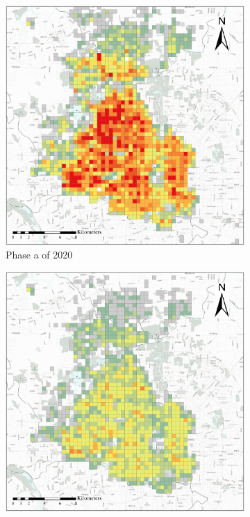 \documentclass[preprints,ijgi,submit,moreauthors]{Definitions/mdpi}
\begin{document}
\begin{figure}[ht]
    \centering
    \begin{subfigure}{.28\textwidth}
        \includegraphics[width=\textwidth]{Figures/BSSPhase1_2020.eps}
        \caption{Phase a of 2020}\label{fig:p_a_2020}
    \end{subfigure}
    \begin{subfigure}{.28\textwidth}
        \includegraphics[width=\textwidth]{Figures/BSSPhase2_2020.eps}

\end{subfigure}
\end{figure}
\end{document}
